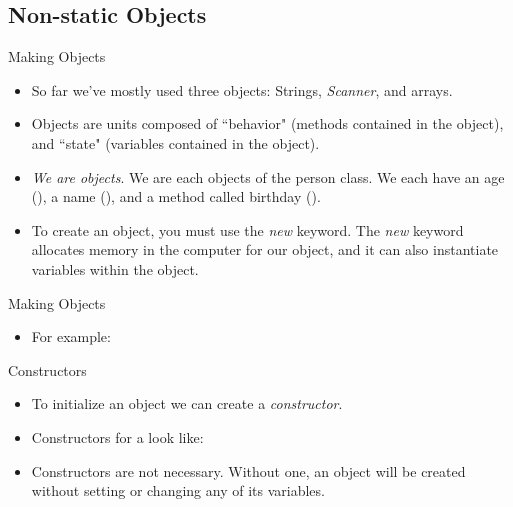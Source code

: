 \subsection{Non-static Objects}
\begin{frame}{Making Objects}
\begin{itemize}
\item So far we've mostly used three objects: Strings, \emph{Scanner}, and arrays.  \pause
\item Objects are units composed of ``behavior" (methods contained in the object), and ``state" (variables contained in the object).  \pause
\item \emph{We are objects}. We are each objects of the person class. We each have an age (), a name (), and a method called birthday ().  \pause
\item To create an object, you must use the \emph{new} keyword. The \emph{new} keyword allocates memory in the computer for our object, and it can also instantiate variables within the object.

\end{itemize}
\end{frame}
\begin{frame}{Making Objects}
\begin{itemize}

    \item For example:\\
\end{itemize}
\end{frame}

\begin{frame}[fragile]{Constructors}
\begin{itemize}
\item To initialize an object we can create a \emph{constructor}. \pause
\item Constructors for a  look like:
\begin{center}
\end{center}\pause
\begin{semiverbatim}\end{semiverbatim} \pause
\item Constructors are not necessary. Without one, an object will be created without setting or changing any of its variables.
\end{itemize}
\end{frame}

